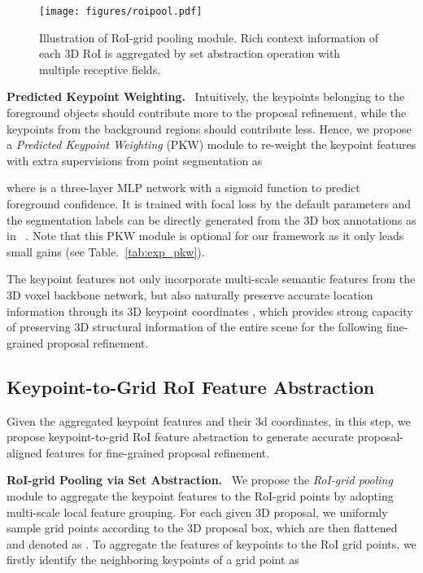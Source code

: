 \documentclass[natbib,twocolumn]{svjour3}          \smartqed  \usepackage{graphicx}
\begin{document}
\begin{figure}[t]
	\begin{center}
		\texttt{[image: figures/roipool.pdf]}
	\end{center}
	\vspace{-0.2cm}
	\caption{Illustration of RoI-grid pooling module. Rich context information of each 3D RoI is aggregated by set abstraction operation with multiple receptive fields.}
	\label{fig:roipool}
\end{figure}


\noindent
\textbf{Predicted Keypoint Weighting.}~
Intuitively, the keypoints belonging to the foreground objects should contribute more to the proposal refinement, while the keypoints from the background regions should contribute less.
Hence, we propose a \textit{Predicted Keypoint Weighting} (PKW) module to re-weight the keypoint features with extra supervisions from point segmentation as 

where  is a three-layer MLP network with a sigmoid function to predict foreground confidence. 
It is trained with focal loss \citep{lin2018focal} by the default parameters and the segmentation labels can be directly generated from the 3D box annotations as in ~\citep{shi2019pointrcnn}. 
Note that this PKW module is optional for our framework as it only leads small gains (see Table.~\ref{tab:exp_pkw}).


The keypoint features  not only incorporate multi-scale semantic features from the 3D voxel backbone network, but also naturally preserve accurate location information through its 3D keypoint coordinates , which provides strong capacity of preserving 3D structural information of the entire scene for the following fine-grained proposal refinement.


\subsection{Keypoint-to-Grid RoI Feature Abstraction}\label{sec:roi_grid_pool}
Given the aggregated keypoint features and their 3d coordinates, in this step, we propose keypoint-to-grid RoI feature abstraction to generate accurate proposal-aligned features for fine-grained proposal refinement. 

\noindent
\textbf{RoI-grid Pooling via Set Abstraction.}~
We propose the \textit{RoI-grid pooling} module to aggregate the keypoint features to the RoI-grid points by adopting multi-scale local feature grouping.
For each given 3D proposal, we uniformly sample  grid points according to the 3D proposal box, which are then flattened and denoted as .
To aggregate the features of keypoints to the RoI grid points, 
we firstly identify the neighboring keypoints of a grid point  as 
\end{document}

